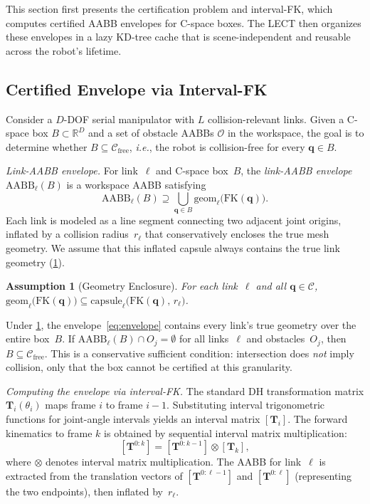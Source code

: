 \documentclass[letterpaper, conference]{IEEEtran}
\newtheorem{assumption}{Assumption}
\newcommand{\Cfree}{\mathcal{C}_\text{free}}
\newcommand{\Cspace}{\mathcal{C}}
\newcommand{\AABB}{\text{AABB}}
\newcommand{\FK}{\text{FK}}
\newcommand{\Real}{\mathbb{R}}
\newcommand{\calO}{\mathcal{O}}
\newcommand{\bT}{\mathbf{T}}
\newcommand{\ie}{\textit{i.e.},\xspace}
\begin{document}
This section first presents the certification problem and
interval-FK, which computes certified AABB envelopes for C-space boxes.
The LECT then organizes these envelopes in a
lazy KD-tree cache that is scene-independent and reusable across the
robot's lifetime.

\subsection{Certified Envelope via Interval-FK}\label{sec:ifk}

Consider a $D$-DOF serial manipulator with $L$ collision-relevant links.
Given a C-space box $B \subset \Real^D$ and a set of obstacle
AABBs $\calO$ in the workspace, the goal is to determine whether
$B \subseteq \Cfree$, \ie the robot is collision-free for every
$\bm{q} \in B$.

\emph{Link-AABB envelope.}
For link~$\ell$ and C-space box~$B$, the \emph{link-AABB envelope}
$\AABB_\ell(B)$ is a workspace AABB satisfying
\begin{equation}\label{eq:envelope}
  \AABB_\ell(B) \supseteq \bigcup_{\bm{q} \in B}
    \mathrm{geom}_\ell\bigl(\FK(\bm{q})\bigr).
\end{equation}
Each link is modeled as a line segment connecting two adjacent joint
origins, inflated by a collision radius~$r_\ell$ that conservatively
encloses the true mesh geometry.
We assume that this inflated capsule always contains the true link
geometry (\cref{asm:geom}).

\begin{assumption}[Geometry Enclosure]\label{asm:geom}
For each link~$\ell$ and all $\bm{q} \in \Cspace$,
$\mathrm{geom}_\ell\bigl(\FK(\bm{q})\bigr) \subseteq
 \mathrm{capsule}_\ell\bigl(\FK(\bm{q}),\, r_\ell\bigr)$.
\end{assumption}

Under \cref{asm:geom}, the envelope~\eqref{eq:envelope} contains
every link's true geometry over the entire box~$B$.
If $\AABB_\ell(B) \cap O_j = \emptyset$ for all links~$\ell$ and
obstacles~$O_j$, then $B \subseteq \Cfree$.
This is a conservative sufficient condition: intersection does
\emph{not} imply collision, only that the box cannot be certified at
this granularity.

\emph{Computing the envelope via interval-FK.}
The standard DH transformation matrix $\bT_i(\theta_i)$ maps frame $i$
to frame $i{-}1$.
Substituting interval trigonometric functions for joint-angle intervals
yields an interval matrix $[\bT_i]$.
The forward kinematics to frame $k$ is obtained by sequential interval
matrix multiplication:
\begin{equation}\label{eq:chain}
  [\bT^{0:k}] = [\bT^{0:k-1}] \otimes [\bT_k],
\end{equation}
where $\otimes$ denotes interval matrix multiplication.
The AABB for link~$\ell$ is extracted from the translation vectors of
$[\bT^{0:\ell-1}]$ and $[\bT^{0:\ell}]$ (representing the two
endpoints), then inflated by~$r_\ell$.
\end{document}
